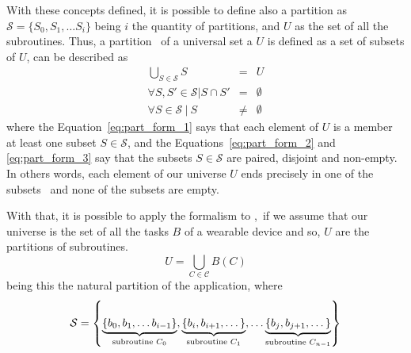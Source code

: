         
        With these concepts defined, it is possible to define also a partition as $ \mathcal{S} = \{S_0, S_1, \dots S_i\} $ being $ i $ the quantity of partitions, and $ U $ as the set of all the subroutines.
        Thus, a partition \Ss\ of a universal set a $ U $ is defined as a set of subsets of $ U $, can be described as
        \begin{eqnarray}
        \bigcup_{S \in \mathcal{S}} S &=& U           \label{eq:part_form_1} \\
        \forall S, S' \in \mathcal{S} | S \cap S' &=& \emptyset  \label{eq:part_form_2}\\
        \forall S \in \mathcal{S}\ |\ S &\neq& \emptyset  \label{eq:part_form_3}
        \end{eqnarray}
        where the Equation~\ref{eq:part_form_1} says that each element of $ U $ is a member at least one subset $ S \in \mathcal{S} $, and the Equations~\ref{eq:part_form_2} and \ref{eq:part_form_3} say that the subsets $ S \in \mathcal{S} $ are paired, disjoint and non-empty.
        In others words, each element of our universe $ U $ ends precisely in one of the subsets \Ss\ and none of the subsets are empty.
        
        With that, it is possible to apply the formalism to \A,\ if we assume that our universe is the set of all the tasks $ B $ of a wearable device and so, $ U $ are the partitions of subroutines.
        \begin{equation}
        U = \bigcup_{C \in \mathcal{C}} B(C) \label{eq:bigcup}
        \end{equation}
        being this the natural partition of the application, where
        \begin{equation} \small
        \mathcal{S}  = \left \{
        \underbrace{\left \{ b_0, b_1, \dots b_{i-1} \right \}}_{\textnormal{subroutine }C_0},
        \underbrace{\left \{ b_i, b_{i+1}, \dots \right \}}_{\textnormal{subroutine }C_1},\dots
        \underbrace{\left \{ b_j, b_{j+1}, \dots \right \}}_{\textnormal{subroutine }C_{n-1}}
        \right \}
        \end{equation}
        
